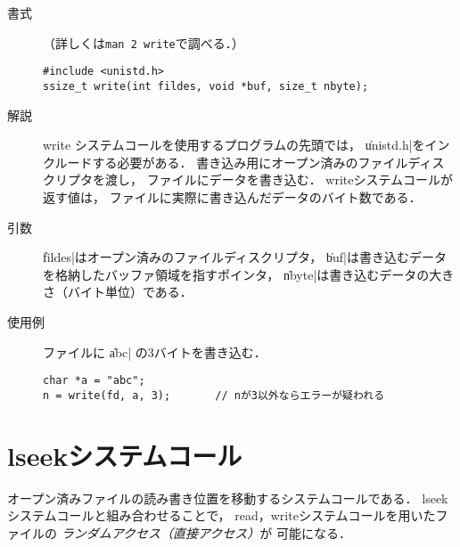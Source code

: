 \begin{description}
\item[書式]（詳しくは\texttt{man 2 write}で調べる．）

\begin{lstlisting}[numbers=none]
#include <unistd.h>
ssize_t write(int fildes, void *buf, size_t nbyte);
\end{lstlisting}

\item[解説]
write システムコールを使用するプログラムの先頭では，
\|unistd.h|をインクルードする必要がある．
書き込み用にオープン済みのファイルディスクリプタを渡し，
ファイルにデータを書き込む．
writeシステムコールが返す値は，
ファイルに実際に書き込んだデータのバイト数である．

\item[引数]
\|fildes|はオープン済みのファイルディスクリプタ，
\|buf|は書き込むデータを格納したバッファ領域を指すポインタ，
\|nbyte|は書き込むデータの大きさ（バイト単位）である．

\item[使用例]
ファイルに \|abc| の3バイトを書き込む．

\begin{lstlisting}[numbers=none]
char *a = "abc";
n = write(fd, a, 3);       // nが3以外ならエラーが疑われる
\end{lstlisting}

\end{description}

\section{lseekシステムコール}
オープン済みファイルの読み書き位置を移動するシステムコールである．
lseekシステムコールと組み合わせることで，
read，writeシステムコールを用いたファイルの
\emph{ランダムアクセス（直接アクセス）}が
可能になる．

